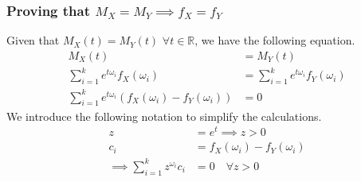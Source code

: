 \subsubsection*{Proving that $M_X=M_Y \implies f_X = f_Y$}
Given that $M_X(t) = M_Y(t)$ $\forall t\in \mathbb{R}$, we have the following equation.
\begin{align*}
	M_X(t)                                                                 & = M_Y(t)                                   \\
	\sum_{i=1}^k e^{t\omega_i} f_X(\omega_i)                               & = \sum_{i=1}^k e^{t\omega_i} f_Y(\omega_i) \\
	\sum_{i=1}^k e^{t\omega_i} \left(f_X(\omega_i) -  f_Y(\omega_i)\right) & = 0
\end{align*}
We introduce the following notation to simplify the calculations.
\begin{align*}
	z                                      & = e^t  \implies z > 0           \\
	c_i                                    & = f_X(\omega_i) - f_Y(\omega_i) \\
	\implies \sum_{i=1}^k z^{\omega_i} c_i & = 0\hspace{1em}\forall z>0
\end{align*}

